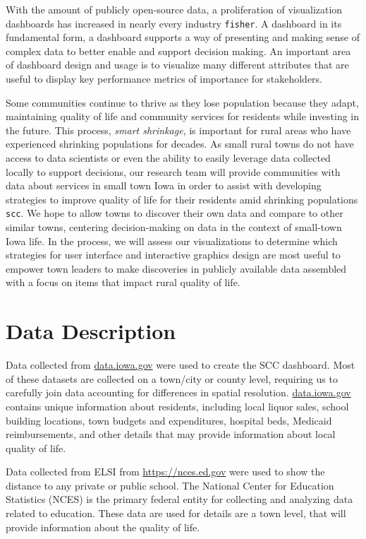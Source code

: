 \documentclass[letterpaper,inpress]{jdsart}
\begin{document}
With the amount of publicly open-source data, a proliferation of visualization dashboards has increased in nearly every industry \texttt{fisher}.
A dashboard in its fundamental form, a dashboard supports a way of presenting and making sense of complex data to better enable and support decision making. An important area of dashboard design and usage is to visualize many different attributes that are useful to display key performance metrics of importance for stakeholders.

Some communities continue to thrive as they lose population because they adapt, maintaining quality of life and community services for residents while investing in the future.
This process, \emph{smart shrinkage}, is important for rural areas who have experienced shrinking populations for decades. As small rural towns do not have access to data scientists or even the ability to easily leverage data collected locally to support decisions, our research team will provide communities with data about services in small town Iowa in order to assist with developing strategies to improve quality of life for their residents amid shrinking populations \texttt{scc}. We hope to allow towns to discover their own data and compare to other similar towns, centering decision-making on data in the context of small-town Iowa life. In the process, we will assess our visualizations to determine which strategies for user interface and interactive graphics design are most useful to empower town leaders to make discoveries in publicly available data assembled with a focus on items that impact rural quality of life.

\section{Data Description}

Data collected from \url{data.iowa.gov} were used to create the SCC dashboard. Most of these datasets are collected on a town/city or county level, requiring us to carefully join data accounting for differences in spatial resolution. \url{data.iowa.gov} contains unique information about residents, including local liquor sales, school building locations, town budgets and expenditures, hospital beds, Medicaid reimbursements, and other details that may provide information about local quality of life.

Data collected from ELSI from \url{https://nces.ed.gov} were used to show the distance to any private or public school. The National Center for Education Statistics (NCES) is the primary federal entity for collecting and analyzing data related to education. These data are used for details are a town level, that will provide information about the quality of life.
\end{document}

